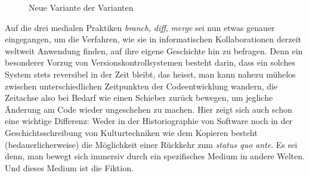 \documentclass[a4paper,11pt]{article}
\newcommand{\inanf}[1]{›#1‹}
\begin{document}
\begin{figure}[hpt]
\begin{center}
\end{center}
\caption{Neue Variante der Varianten}\label{abb:merge}
\end{figure}

Auf die drei medialen Praktiken \emph{branch}, \emph{diff}, \emph{merge} sei nun etwas genauer eingegangen, um die Verfahren, wie sie in informatischen Kollaborationen derzeit weltweit Anwendung finden, auf ihre eigene Geschichte hin zu befragen. Denn ein besonderer Vorzug von Versionskontrollsystemen besteht darin, dass ein solches System stets reversibel in der Zeit bleibt, das heisst, man kann nahezu mühelos zwischen unterschiedlichen Zeitpunkten der Codeentwicklung wandern, die Zeitachse also bei Bedarf wie einen Schieber zurück bewegen, um jegliche Änderung am Code wieder ungeschehen zu machen. Hier zeigt sich auch schon eine wichtige Differenz: Weder in der Historiographie von Software noch in der Geschichtsschreibung von Kulturtechniken wie dem Kopieren besteht (bedauerlicherweise) die Möglichkeit einer Rückkehr zum \emph{status quo ante}. Es sei denn, man bewegt sich immersiv durch ein spezifisches Medium in andere Welten. Und dieses Medium ist die Fiktion.

\begin{comment}


Konfliktlösung
Vorteil: Das Zurückgehen in der Zeit. 

Graphentheoretische Darstellung. Beispiel. Briefroman Gefährliche Liebschaften
Source Control. Kontrolle behalten über die Quellen. 

\end{comment}
\end{document}
